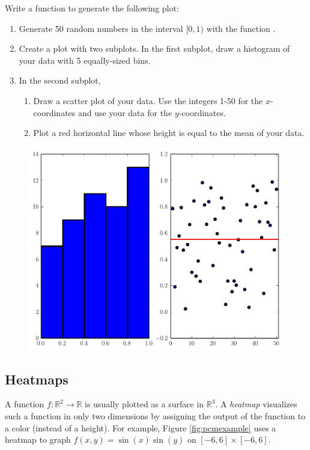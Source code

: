 \begin{problem} %
\label{prob:subplot}
Write a function to generate the following plot:
\begin{enumerate}
\item Generate 50 random numbers in the interval $[0,1)$ with the function .
\item Create a plot with two subplots. 
In the first subplot, draw a histogram of your data with 5 equally-sized bins.
\item In the second subplot, 
\begin{enumerate}
\item Draw a scatter plot of your data. 
Use the integers 1-50 for the $x$-coordinates and use your data for the $y$-coordinates.
\item Plot a red horizontal line whose height is equal to the mean of your data.
\end{enumerate}
\end{enumerate}

\begin{figure}[H]
\includegraphics[width=.7\textwidth]{subplotProb.pdf}
\label{fig:subplotProb}
\end{figure}
\end{problem}


\subsection*{Heatmaps} %

A function $f: \mathbb{R}^2 \rightarrow \mathbb{R}$ is usually plotted as a surface in $\mathbb{R}^3$.
A \emph{heatmap} visualizes such a function in only two dimensions by assigning the output of the function to a color (instead of a height).
For example, Figure \ref{fig:pcmexample} uses a heatmap to graph $f(x,y) = \sin(x)\sin(y)$ on $[-6,6] \times [-6,6]$.

